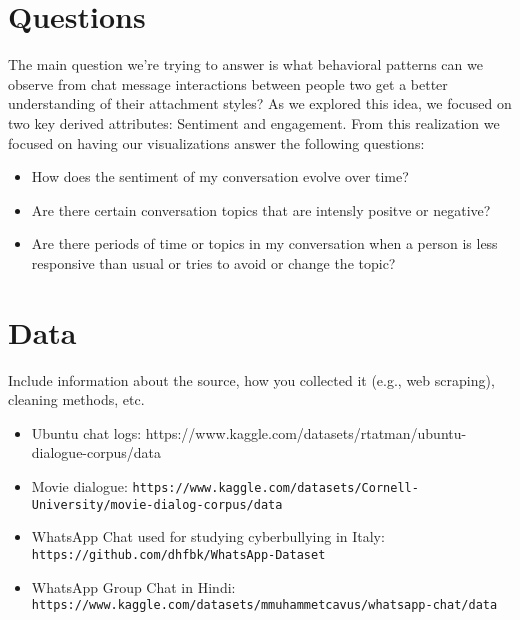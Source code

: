 \documentclass{article}\usepackage{graphicx}
\begin{document}
\section*{Questions}
The main question we're trying to answer is what behavioral patterns can we observe from chat message interactions between people two get a better understanding of their attachment styles? As we explored this idea, we focused on two key derived attributes: Sentiment and engagement. From this realization we focused on having our visualizations answer the following questions:
\begin{itemize}
    \item How does the sentiment of my conversation evolve over time?
    \item Are there certain conversation topics that are intensly positve or negative? 
    \item Are there periods of time or topics in my conversation when a person is less responsive than usual or tries to avoid or change the topic? 
\end{itemize}

\section*{Data}
Include information about the source, how you collected it (e.g., web scraping), cleaning methods, etc.
\begin{itemize}
    \item Ubuntu chat logs: https://www.kaggle.com/datasets/rtatman/ubuntu-dialogue-corpus/data
    \item Movie dialogue: \texttt{https://www.kaggle.com/datasets/Cornell-University/movie-dialog-corpus/data}
    \item WhatsApp Chat used for studying cyberbullying in Italy: \texttt{https://github.com/dhfbk/WhatsApp-Dataset}
    \item WhatsApp Group Chat in Hindi: \texttt{https://www.kaggle.com/datasets/mmuhammetcavus/whatsapp-chat/data}
\end{itemize}
\end{document}
